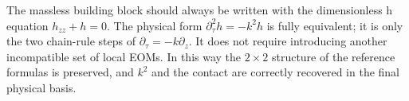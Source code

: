 \documentclass[11pt,a4paper]{article}
\begin{document}
The massless building block should always be written with the dimensionless h equation $h_{zz}+h=0$. The physical form $\partial_\tau^2h=-k^2h$ is fully equivalent; it is only the two chain-rule steps of $\partial_\tau=-k\partial_z$. It does not require introducing another incompatible set of local EOMs. In this way the $2\times2$ structure of the reference formulas is preserved, and $k^2$ and the contact are correctly recovered in the final physical basis.



\end{document}
